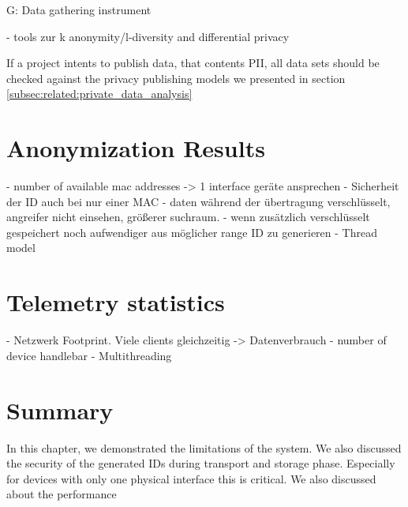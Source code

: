 G: Data gathering instrument



- tools zur k anonymity/l-diversity and differential privacy

If a project intents to publish data, that contents PII, all data sets should be checked against the privacy publishing models we presented in section \ref{subsec:related:private_data_analysis}
%
\newpage
%
 


\section{Anonymization Results}
\label{sec:results:anon}

- number of available mac addresses -> 1 interface geräte ansprechen
- Sicherheit der ID auch bei nur einer MAC
- daten während der übertragung verschlüsselt, angreifer nicht einsehen, größerer suchraum.
- wenn zusätzlich verschlüsselt gespeichert noch aufwendiger aus möglicher range ID zu generieren
- Thread model


%


\section{Telemetry statistics}
\label{sec:results:telemetry}
%
- Netzwerk Footprint. Viele clients gleichzeitig -> Datenverbrauch
- number of device handlebar
- Multithreading

\section{Summary}
In this chapter, we demonstrated the limitations of the system. We also discussed the security of the generated IDs during transport and storage phase. Especially for devices with only one physical interface this is critical. We also discussed about the performance 


